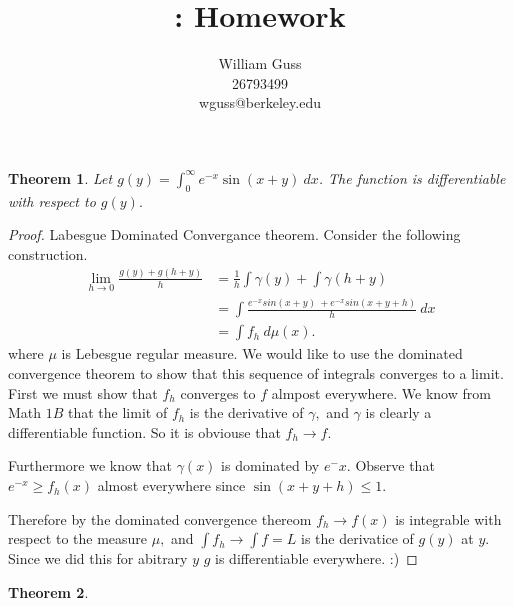 \documentclass[letter]{article}
\title{\bCLASS: Homework \bHWN}
\author{William Guss\\26793499\\wguss@berkeley.edu}
\newtheorem{theorem}{Theorem}
\newenvironment{menumerate}{%
  \edef\backupindent{\the\parindent}%
  \enumerate%
  \setlength{\parindent}{\backupindent}%
}{\endenumerate}
\begin{document}
\maketitle
\thispagestyle{empty}

\begin{menumerate}
    \setcounter{enumi}{42}
    \item \begin{theorem}
    	Let $g(y) = \int_0^\infty e^{-x}\sin(x + y)\ dx$. The function is differentiable with respect to $g(y).$ 
    \end{theorem}
    \begin{proof}
 		Labesgue Dominated Convergance theorem.
 		Consider the following construction.
 		\begin{equation}
 		   	\begin{aligned}
                \lim_{h \to 0} \frac{g(y) + g(h + y)}{h} &= \frac{1}{h} \int \gamma(y) + \int \gamma(h+y) \\
                 &= \int \frac{ e^{-x}sin(x+y)\ + e^{-x}sin(x+y+h)}{h}\ dx \\
                 &=  \int f_h\ d\mu(x).
            \end{aligned}
 		   \end{equation}   
           where $\mu$ is Lebesgue regular measure. We would like to use the dominated convergence theorem to show that this 
           sequence of integrals converges to a limit. First we must show that $f_h$ converges to $f$ almpost everywhere.
           We know from Math $1B$ that the limit of $f_h$ is the derivative  of $\gamma,$ and $\gamma$ is clearly a
           differentiable function. So it is obviouse that $f_h \to f.$

           Furthermore we know that $\gamma(x)$ is dominated by $e^-{x}$. Observe that 
           $e^{-x} \geq f_h(x)$ almost everywhere since $\sin(x+y+h) \leq 1.$

           Therefore by the dominated convergence thereom $f_h\to f(x)$ is integrable with respect to the measure $\mu,$
           and $\int f_h \to \int f = L$ is the derivatice of $g(y)$ at $y.$ Since we did this for abitrary $y$ $g$
           is differentiable everywhere. :)
    \end{proof}
    \setcounter{enumi}{45}
    \item  
    \begin{theorem}
        

\end{theorem}
\end{menumerate}
\end{document}
